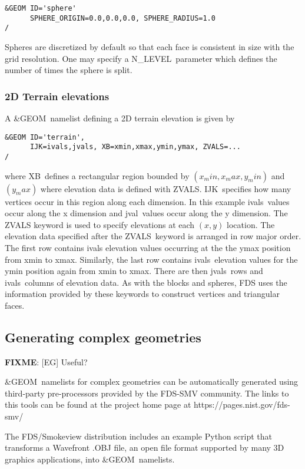 \documentclass[12pt]{article}
\begin{document}
\begin{verbatim}
&GEOM ID='sphere'
      SPHERE_ORIGIN=0.0,0.0,0.0, SPHERE_RADIUS=1.0
/
\end{verbatim}

\noindent Spheres are discretized by default so that each face is consistent in size with the grid resolution.
One may specify a {\ct N\_LEVEL}\ parameter which defines the number of times the sphere is split.

\subsubsection{2D Terrain elevations}
A {\ct \&GEOM}\ namelist defining a 2D terrain elevation is given by

\begin{verbatim}
&GEOM ID='terrain',
      IJK=ivals,jvals, XB=xmin,xmax,ymin,ymax, ZVALS=...
/
\end{verbatim}

\noindent where {\ct XB}\ defines a rectangular region bounded by $(x_min, x_max, y_min)$ and $(y_max)$
where elevation data is defined with {\ct ZVALS}.
{\ct IJK}\ specifies how many vertices occur in this region along each dimension.
In this example {\ct ivals}\ values occur along the x dimension and {\ct jval}\ values occur along the y dimension.
The {\ct ZVALS} keyword is used to specify elevations at each $(x,y)$ location.
The elevation data specified after the {\ct ZVALS}\ keyword is arranged in row major order.
The first row contains {\ct ivals} elevation values occurring at the the ymax position from xmin to xmax.
Similarly, the last row contains
{\ct ivals}\ elevation values for the ymin position again from xmin to xmax.
There are then {\ct jvals}\ rows and {\ct ivals}\ columns of elevation data.
As with the blocks and spheres, FDS uses the information provided by these keywords to construct
vertices and triangular faces.

\subsection{Generating complex geometries}

\textbf{FIXME}: [EG] Useful?

{\ct \&GEOM}\ namelists for complex geometries can be automatically generated using third-party pre-processors
provided by the FDS-SMV community. The links to this tools can be found at the project home page at https://pages.nist.gov/fds-smv/

The FDS/Smokeview distribution includes an example Python script that transforms a Wavefront .OBJ file,
an open file format supported by many 3D graphics applications, into {\ct \&GEOM}\ namelists.
\end{document}
